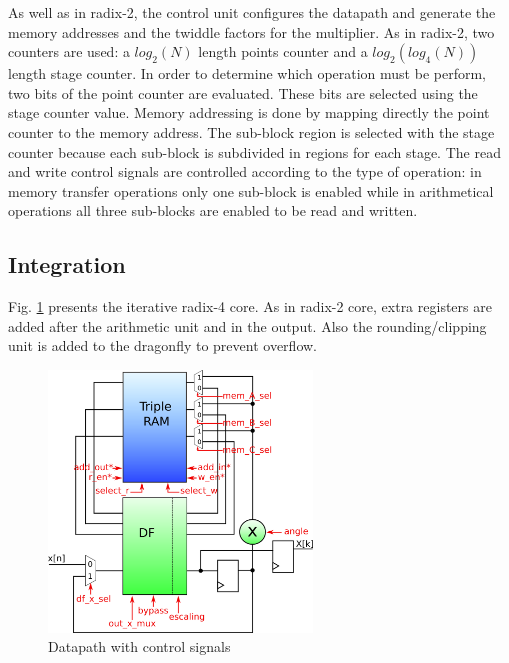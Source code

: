 \documentclass[conference]{IEEEtran}
\begin{document}
As well as in radix-2, the control unit configures the datapath and generate the memory addresses and the twiddle factors for
the multiplier. As in radix-2, two counters are used: a $log_2(N)$ length points counter and a $log_2(log_4(N))$ length stage counter. 
In order to determine which operation must be perform, two bits of the point counter are evaluated. These bits are selected using the stage
counter value. %
Memory addressing is done by mapping directly the point counter to the memory address. The sub-block region is selected with the 
stage counter because each sub-block is subdivided in regions for each stage. The read and write control signals are controlled according 
to the type of operation: in memory transfer operations only one sub-block is enabled while in arithmetical operations all three sub-blocks
are enabled to be read and written.


\subsection{Integration}

Fig. \ref{fig:datapathR4control} presents the iterative radix-4 core. As in radix-2 core, extra registers are added after the arithmetic unit and in 
the output. Also the rounding/clipping unit is added to the dragonfly to prevent overflow.  

\begin{figure}[htb!]
        \centering
        \includegraphics[width=7cm]{./figures/datapathR4control.png}
        \caption{Datapath with control signals}
        \label{fig:datapathR4control}
\end{figure} 
 
\end{document}
